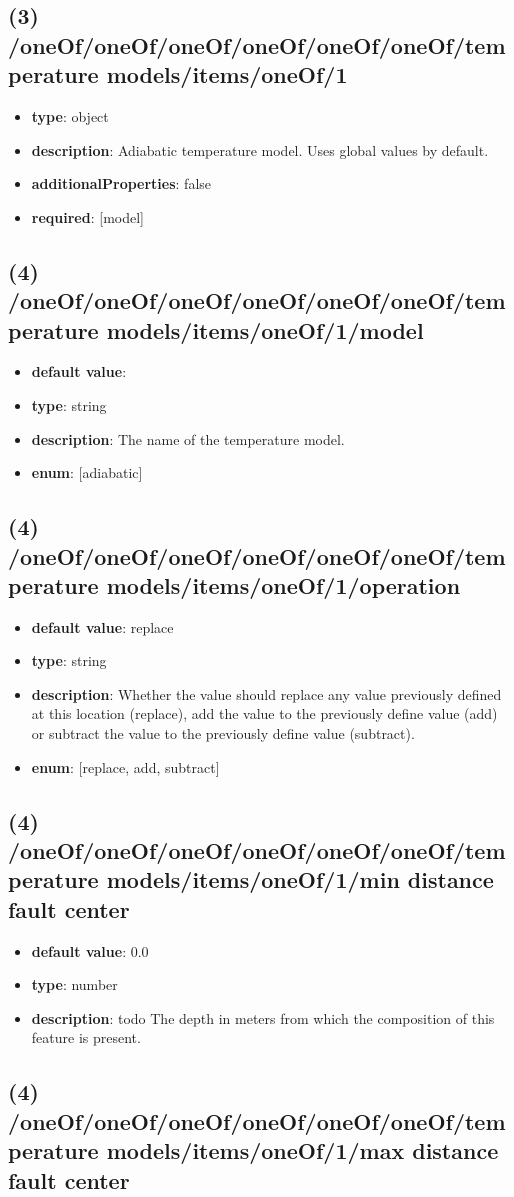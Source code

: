 \subsection{(3) /oneOf/oneOf/oneOf/oneOf/oneOf/oneOf/temperature models/items/oneOf/1}
\begin{itemize}[leftmargin=3em]\item {\bf type}: object
\item {\bf description}: Adiabatic temperature model. Uses global values by default.
\item {\bf additionalProperties}: false
\item {\bf required}: [model]\end{itemize}
\subsection{(4) /oneOf/oneOf/oneOf/oneOf/oneOf/oneOf/temperature models/items/oneOf/1/model}
\begin{itemize}[leftmargin=4em]\item {\bf default value}: 
\item {\bf type}: string
\item {\bf description}: The name of the temperature model.
\item {\bf enum}: [adiabatic]\end{itemize}\subsection{(4) /oneOf/oneOf/oneOf/oneOf/oneOf/oneOf/temperature models/items/oneOf/1/operation}
\begin{itemize}[leftmargin=4em]\item {\bf default value}: replace
\item {\bf type}: string
\item {\bf description}: Whether the value should replace any value previously defined at this location (replace), add the value to the previously define value (add) or subtract the value to the previously define value (subtract).
\item {\bf enum}: [replace, add, subtract]\end{itemize}\subsection{(4) /oneOf/oneOf/oneOf/oneOf/oneOf/oneOf/temperature models/items/oneOf/1/min distance fault center}
\begin{itemize}[leftmargin=4em]\item {\bf default value}: 0.0
\item {\bf type}: number
\item {\bf description}: todo The depth in meters from which the composition of this feature is present.
\end{itemize}\subsection{(4) /oneOf/oneOf/oneOf/oneOf/oneOf/oneOf/temperature models/items/oneOf/1/max distance fault center}
